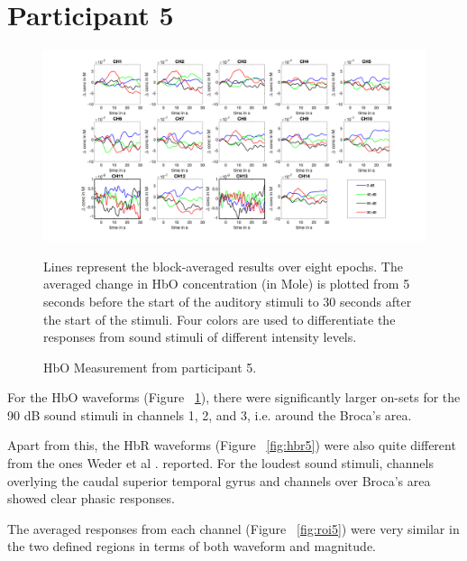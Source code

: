 \section {Participant 5}
\begin{figure}[H]
  \centering
    \includegraphics[scale=.4]{bilder/HbO_Mole/sub_lukas_s_HbO.png}
  \caption{HbO Measurement from participant 5.}
  \label{fig:hbo5}
  \medskip
  \footnotesize {Lines represent the block-averaged results over eight epochs. The averaged change in HbO concentration (in Mole) is plotted from 5 seconds before the start of the auditory stimuli to 30 seconds after the start of the stimuli. Four colors are used to differentiate the responses from sound stimuli of different intensity levels.}
\end{figure}

For the HbO waveforms (Figure ~\ref{fig:hbo5}), there were significantly larger on-sets for the 90 dB sound stimuli in channels 1, 2, and 3, i.e. around the Broca's area.

Apart from this, the HbR waveforms (Figure ~\ref{fig:hbr5}) were also quite different from the ones Weder et al \citeyearpar{Weder2018}. reported. For the loudest sound stimuli, channels overlying the caudal superior temporal gyrus and channels over Broca's area showed clear phasic responses. 

The averaged responses from each channel (Figure ~\ref {fig:roi5}) were very similar in the two defined regions in terms of both waveform and magnitude.


\newpage


